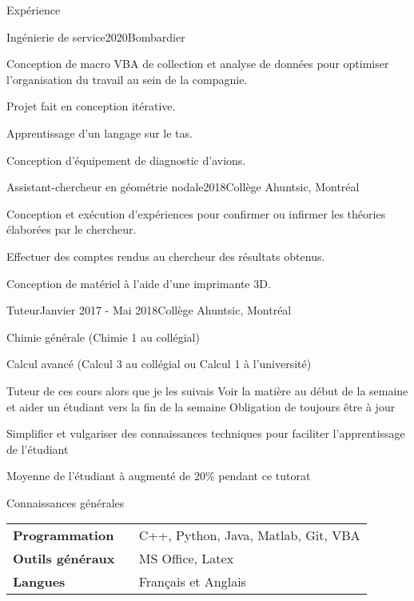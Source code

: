 \documentclass[french,12pt]{resume} %
\begin{document}
	\begin{rSection}{Expérience}
		
		\begin{rSubsection}{Ingénierie de service}{2020}{Bombardier}{}{}
			\item Conception de macro VBA de collection et analyse de données pour optimiser l'organisation du travail au sein de la compagnie.
			\item Projet fait en conception itérative. 
			\item Apprentissage d'un langage sur le tas.
			\item Conception d'équipement de diagnostic d'avions.
		\end{rSubsection}
		
		\begin{rSubsection}{Assistant-chercheur en géométrie nodale}{2018}{Collège Ahuntsic, Montréal}{}
			\item 	Conception et exécution d'expériences pour confirmer ou infirmer les théories élaborées par le chercheur.
			\item   Effectuer des comptes rendus au chercheur des résultats obtenus.
			\item   Conception de matériel à l’aide d’une imprimante 3D.
		\end{rSubsection}
		
		\begin{rSubsection}{Tuteur}{Janvier 2017 - Mai 2018}{Collège Ahuntsic, Montréal}{}
			\item   Chimie générale (Chimie 1 au collégial)
			\item   Calcul avancé  (Calcul 3 au collégial ou Calcul 1 à l'université)
			\item Tuteur de ces cours alors que je les suivais
			   \subitem 	Voir la matière au début de la semaine et aider un étudiant vers la fin de la semaine
			   \subitem    Obligation de toujours être à jour
			\item   Simplifier et vulgariser des connaissances techniques pour faciliter l'apprentissage de l'étudiant
			\item Moyenne de l'étudiant à augmenté de 20\% pendant ce tutorat
		\end{rSubsection}
		
	\end{rSection}
	
	

	
	\begin{rSection}{Connaissances générales}
		
		\begin{tabular}{ @{} >{\bfseries}l @{\hspace{6ex}} l }
			Programmation \              & C++, Python, Java, Matlab, Git, VBA \\
			Outils généraux                 & MS Office, Latex \\
			Langues & Français et Anglais
		\end{tabular}
		
	\end{rSection}
	
	
\end{document}
